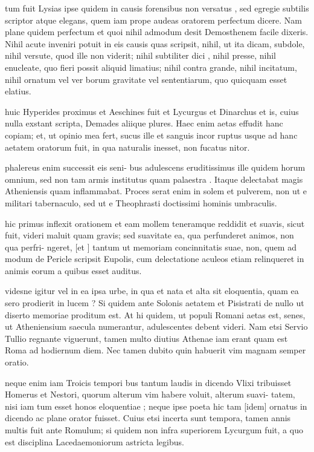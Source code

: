  tum fuit Lysias ipse quidem in causis forensibus non versatus , sed egregie subtilis scriptor atque elegans, quem iam prope audeas oratorem perfectum dicere. Nam plane quidem perfectum et quoi nihil admodum desit Demosthenem facile dixeris. Nihil acute inveniri potuit in eis causis quas scripsit, nihil, ut ita dicam, subdole, nihil versute, quod ille non viderit; nihil subtiliter dici , nihil presse, nihil enucleate, quo fieri possit aliquid limatius; nihil contra grande, nihil incitatum, nihil ornatum vel ver borum gravitate vel sententiarum, quo quicquam esset elatius.

 huic Hyperides proximus et Aeschines fuit et Lycurgus et Dinarchus et is, cuius nulla exstant scripta, Demades aliique plures. Haec enim aetas effudit hanc copiam; et, ut opinio mea fert, sucus ille et sanguis incor ruptus usque ad hanc aetatem oratorum fuit, in qua naturalis inesset, non fucatus nitor.

 phalereus enim successit eis seni- bus adulescens eruditissimus ille quidem horum omnium, sed non tam armis institutus quam palaestra . Itaque delectabat magis Atheniensis quam inflammabat. Proces serat enim in solem et pulverem, non ut e militari tabernaculo, sed ut e Theophrasti doctissimi hominis umbraculis.

 hic primus inflexit orationem et eam mollem teneramque reddidit et suavis, sicut fuit, videri maluit quam gravis; sed suavitate ea, qua perfunderet animos, non qua perfri- ngeret, [et ] tantum ut memoriam concinnitatis suae, non, quem ad modum de Pericle scripsit Eupolis, cum delectatione aculeos etiam relinqueret in animis eorum a quibus esset auditus.

 videsne igitur vel in ea ipsa urbe, in qua et nata et alta sit eloquentia, quam ea sero prodierit in lucem ? Si quidem ante Solonis aetatem et Pisistrati de nullo ut diserto memoriae proditum est. At hi quidem, ut populi Romani aetas est, senes, ut Atheniensium saecula numerantur, adulescentes debent videri. Nam etsi Servio Tullio regnante viguerunt, tamen multo diutius Athenae iam erant quam est Roma ad hodiernum diem. Nec tamen dubito quin habuerit vim magnam semper oratio.

 neque enim iam Troicis tempori bus tantum laudis in dicendo Vlixi tribuisset Homerus et Nestori, quorum alterum vim habere voluit, alterum suavi- tatem, nisi iam tum esset honos eloquentiae ; neque ipse poeta hic tam [idem] ornatus in dicendo ac plane orator fuisset. Cuius etsi incerta sunt tempora, tamen annis multis fuit ante Romulum; si quidem non infra superiorem Lycurgum fuit, a quo est disciplina Lacedaemoniorum astricta legibus.

